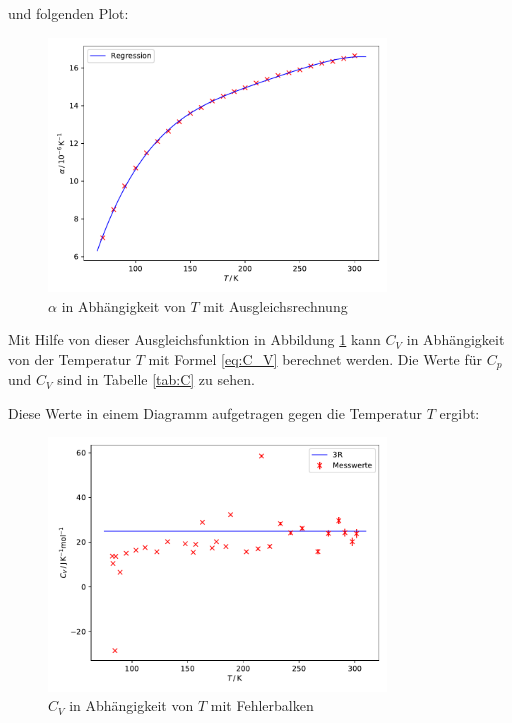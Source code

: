 und folgenden Plot:

\begin{figure}[H]
    \centering
    \includegraphics[width=0.8\textwidth]{build/alpha.pdf}
    \caption{$\alpha$ in Abhängigkeit von $T$ mit Ausgleichsrechnung}
    \label{fig:alpha_plot}
\end{figure}

Mit Hilfe von dieser Ausgleichsfunktion in Abbildung \ref{fig:alpha_plot} kann $C_V$ in Abhängigkeit von der Temperatur $T$ mit Formel \eqref{eq:C_V} berechnet werden. Die Werte für $C_p$ und $C_V$ sind in Tabelle \ref{tab:C} zu sehen.


Diese Werte in einem Diagramm aufgetragen gegen die Temperatur $T$ ergibt:

\begin{figure}[H]
    \centering
    \includegraphics[width=0.8\textwidth]{build/C_V.pdf}
    \caption{$C_V$ in Abhängigkeit von $T$ mit Fehlerbalken}
    \label{fig:C_V}
\end{figure}

